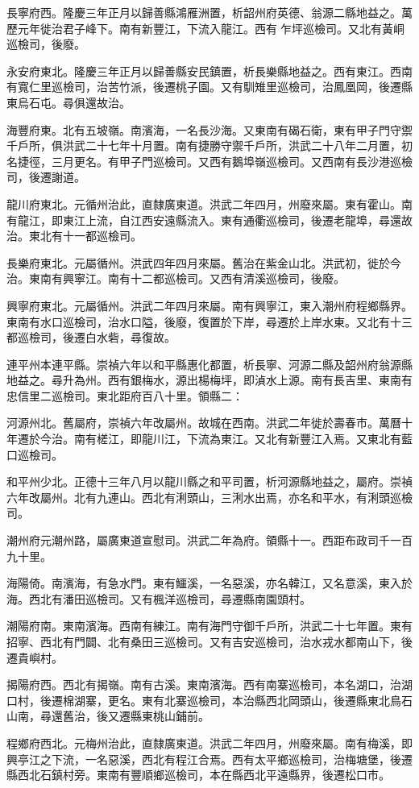 長寧府西。隆慶三年正月以歸善縣鴻雁洲置，析韶州府英德、翁源二縣地益之。萬歷元年徙治君子峰下。南有新豐江，下流入龍江。西有乍坪巡檢司。又北有黃峒巡檢司，後廢。

永安府東北。隆慶三年正月以歸善縣安民鎮置，析長樂縣地益之。西有東江。西南有寬仁里巡檢司，治苦竹派，後遷桃子園。又有馴雉里巡檢司，治鳳凰岡，後遷縣東烏石屯。尋俱還故治。

海豐府東。北有五坡嶺。南濱海，一名長沙海。又東南有碣石衛，東有甲子門守禦千戶所，俱洪武二十七年十月置。南有捷勝守禦千戶所，洪武二十八年二月置，初名捷徑，三月更名。有甲子門巡檢司。又西有鵝埠嶺巡檢司。又西南有長沙港巡檢司，後遷謝道。

龍川府東北。元循州治此，直隸廣東道。洪武二年四月，州廢來屬。東有霍山。南有龍江，即東江上流，自江西安遠縣流入。東有通衢巡檢司，後遷老龍埠，尋還故治。東北有十一都巡檢司。

長樂府東北。元屬循州。洪武四年四月來屬。舊治在紫金山北。洪武初，徙於今治。東南有興寧江。南有十二都巡檢司。又西有清溪巡檢司，後廢。

興寧府東北。元屬循州。洪武二年四月來屬。南有興寧江，東入潮州府程鄉縣界。東南有水口巡檢司，治水口隘，後廢，復置於下岸，尋遷於上岸水東。又北有十三都巡檢司，後遷白水砦，尋復故。

連平州本連平縣。崇禎六年以和平縣惠化都置，析長寧、河源二縣及韶州府翁源縣地益之。尋升為州。西有銀梅水，源出楊梅坪，即湞水上源。南有長吉里、東南有忠信里二巡檢司。東北距府百八十里。領縣二：

河源州北。舊屬府，崇禎六年改屬州。故城在西南。洪武二年徙於壽春市。萬曆十年遷於今治。南有槎江，即龍川江，下流為東江。又北有新豐江入焉。又東北有藍口巡檢司。

和平州少北。正德十三年八月以龍川縣之和平司置，析河源縣地益之，屬府。崇禎六年改屬州。北有九連山。西北有浰頭山，三浰水出焉，亦名和平水，有浰頭巡檢司。

潮州府元潮州路，屬廣東道宣慰司。洪武二年為府。領縣十一。西距布政司千一百九十里。

海陽倚。南濱海，有急水門。東有鱷溪，一名惡溪，亦名韓江，又名意溪，東入於海。西北有潘田巡檢司。又有楓洋巡檢司，尋遷縣南園頭村。

潮陽府南。東南濱海。西南有練江。南有海門守御千戶所，洪武二十七年置。東有招寧、西北有門闢、北有桑田三巡檢司。又有吉安巡檢司，治水戎水都南山下，後遷貴嶼村。

揭陽府西。西北有揭嶺。南有古溪。東南濱海。西有南寨巡檢司，本名湖口，治湖口村，後遷棉湖寨，更名。東有北寨巡檢司，本治縣西北岡頭山，後遷縣東北鳥石山南，尋還舊治，後又遷縣東桃山鋪前。

程鄉府西北。元梅州治此，直隸廣東道。洪武二年四月，州廢來屬。南有梅溪，即興亭江之下流，一名惡溪，西北有程江合焉。西有太平鄉巡檢司，治梅塘堡，後遷縣西北石鎮村旁。東南有豐順鄉巡檢司，本在縣西北平遠縣界，後遷松口市。


